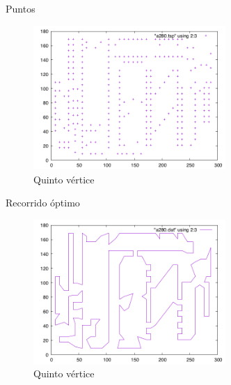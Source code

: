 \begin{frame}
	\begin{exampleblock}{Puntos}
	\begin{figure}[htbH]
		\centering
		\includegraphics[width=0.65\textwidth]{../Viajante/Imagenes/a280.png}
		\caption{Quinto vértice}
	\end{figure}
	\end{exampleblock}
\end{frame}

\begin{frame}
	\begin{exampleblock}{Recorrido óptimo}
	\begin{figure}[htbH]
		\centering
		\includegraphics[width=0.65\textwidth]{../Viajante/Imagenes/a280_opt.png}
		\caption{Quinto vértice}
	\end{figure}
	\end{exampleblock}
\end{frame}

















